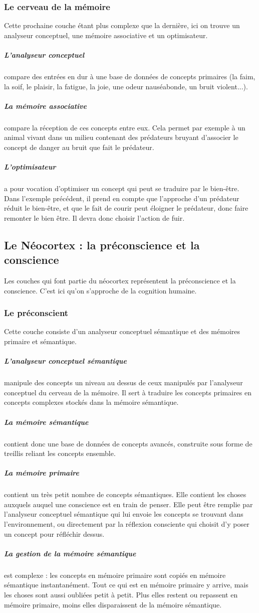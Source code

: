 \subsubsection{Le cerveau de la mémoire} Cette prochaine couche étant plus
complexe que la dernière, ici on trouve un analyseur conceptuel, une mémoire
associative et un optimisateur.
\subparagraph {L'analyseur conceptuel} compare des entrées en dur à une base de
données de concepts primaires (la faim, la soif, le plaisir, la fatigue, la joie, une odeur
nauséabonde, un bruit violent...).
\subparagraph {La mémoire associative} compare la réception de ces concepts
entre eux. Cela permet par exemple à un animal vivant dans un milieu contenant des prédateurs
bruyant d’associer le concept de danger au bruit que fait le prédateur.
\subparagraph {L’optimisateur} a pour vocation d’optimiser un concept qui peut
se traduire par le bien-être. Dans l’exemple précédent, il prend en compte que l’approche d’un
prédateur réduit le bien-être, et que le fait de courir peut éloigner le
prédateur, donc faire remonter le bien être. Il devra donc choisir l’action de
fuir.

\subsection{Le Néocortex : la préconscience et la conscience}
Les couches qui font partie du néocortex représentent la préconscience et la
conscience. C'est ici qu'on s'approche de la cognition humaine.
\subsubsection{Le préconscient} Cette couche consiste d'un analyseur
conceptuel sémantique et des mémoires primaire et sémantique.
\subparagraph{L'analyseur conceptuel sémantique} manipule des concepts un niveau
au dessus de ceux manipulés par l’analyseur conceptuel du cerveau de la mémoire. Il sert à
traduire les concepts primaires en concepts complexes stockés dans la mémoire
sémantique.
\subparagraph{La mémoire sémantique} contient donc une base de
données de concepts avancés, construite sous forme de treillis reliant les concepts ensemble.
\subparagraph{La mémoire primaire} contient un très petit nombre de concepts
sémantiques. Elle contient les choses auxquels auquel une conscience est en
train de penser. Elle peut être remplie par l’analyseur conceptuel sémantique qui lui envoie les
concepts se trouvant dans l’environnement, ou directement par la réflexion
consciente qui choisit d’y poser un concept pour réfléchir dessus.
\subparagraph{La gestion de la mémoire sémantique} est complexe : les concepts
en mémoire primaire sont copiés en mémoire sémantique instantanément. Tout ce qui est en
mémoire primaire y arrive, mais les choses sont aussi oubliées petit à petit.
Plus elles restent ou repassent en mémoire primaire, moins elles disparaissent
de la mémoire sémantique.

